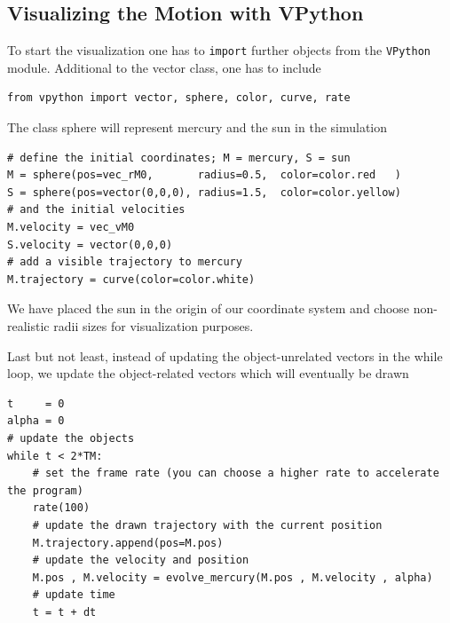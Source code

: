 \documentclass[12pt,ngerman,american]{iopart}
\begin{document}
\subsection{Visualizing the Motion with VPython}
To start the visualization one has to \texttt{import} further objects from the \texttt{VPython} module.
Additional to the vector class, one has to include
\begin{lstlisting}
from vpython import vector, sphere, color, curve, rate
\end{lstlisting}
The class sphere will represent mercury and the sun in the simulation
\begin{lstlisting}
# define the initial coordinates; M = mercury, S = sun
M = sphere(pos=vec_rM0,       radius=0.5,  color=color.red   )
S = sphere(pos=vector(0,0,0), radius=1.5,  color=color.yellow)
# and the initial velocities
M.velocity = vec_vM0
S.velocity = vector(0,0,0)
# add a visible trajectory to mercury
M.trajectory = curve(color=color.white)
\end{lstlisting}
We have placed the sun in the origin of our coordinate system and choose non-realistic radii sizes for visualization purposes.

Last but not least, instead of updating the object-unrelated vectors in the while loop, we update the object-related vectors which will eventually be drawn
\begin{lstlisting}
t     = 0
alpha = 0
# update the objects
while t < 2*TM:
	# set the frame rate (you can choose a higher rate to accelerate the program)
	rate(100)
	# update the drawn trajectory with the current position
	M.trajectory.append(pos=M.pos)
	# update the velocity and position
	M.pos , M.velocity = evolve_mercury(M.pos , M.velocity , alpha)
	# update time
	t = t + dt
\end{lstlisting}
\end{document}
